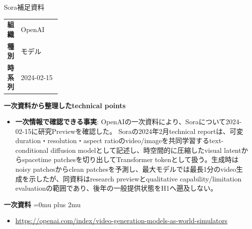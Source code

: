 \Needspace{0.38\textheight}
\begin{technicalnote}{Sora}{補足資料}
\begingroup
\begin{tabularx}{\linewidth}{@{}>{\bfseries}p{0.22\linewidth}X@{}}
組織 & OpenAI \\
種別 & モデル \\
時系列 & 2024-02-15 \\
\end{tabularx}
\smallskip
{\bfseries 一次資料から整理したtechnical points}
\begin{itemize}[leftmargin=1.5em,itemsep=0.35em]
\item \textbf{一次情報で確認できる事実}: OpenAIの一次資料により、Soraについて2024-02-15に研究Previewを確認した。 Soraの2024年2月technical reportは、可変duration・resolution・aspect ratioのvideo/imageを共同学習するtext-conditional diffusion modelとして記述し、時空間的に圧縮したvisual latentからspacetime patchesを切り出してTransformer tokenとして扱う。生成時はnoisy patchesからclean patchesを予測し、最大モデルでは最長1分のvideo生成を示したが、同資料はresearch previewとqualitative capability/limitation evaluationの範囲であり、後年の一般提供状態をH1へ遡及しない。
\end{itemize}
\begin{minipage}{\linewidth}
\begin{samepage}
{\bfseries 一次資料}
\begingroup\sloppy
\Urlmuskip=0mu plus 2mu\relax
\begin{itemize}[leftmargin=1.5em,itemsep=0.25em]
\item {\scriptsize\url{https://openai.com/index/video-generation-models-as-world-simulators}}
\end{itemize}
\endgroup
\end{samepage}
\end{minipage}
\endgroup
\end{technicalnote}
\medskip

